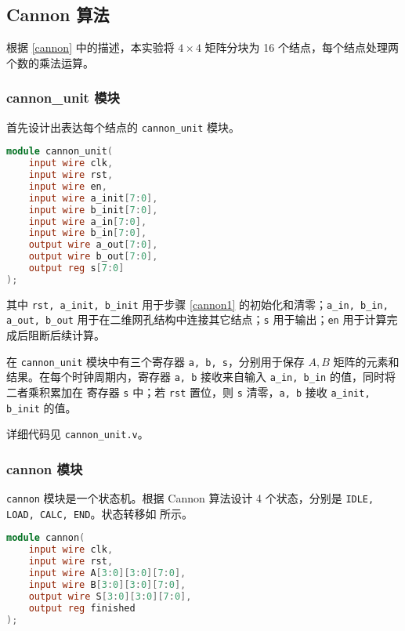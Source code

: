 \documentclass{zjureport-zh}
\begin{document}
\subsection{Cannon 算法}
\par 根据 \ref{cannon} 中的描述，本实验将 $4 \times 4$ 矩阵分块为 16 个结点，每个结点处理两个数的乘法运算。
\subsubsection{cannon\_unit 模块}
\par 首先设计出表达每个结点的 \texttt{cannon\_unit} 模块。
\begin{lstlisting}[language=verilog]
module cannon_unit(
	input wire clk,
	input wire rst,
	input wire en,
	input wire a_init[7:0],
	input wire b_init[7:0],
	input wire a_in[7:0],
	input wire b_in[7:0],
	output wire a_out[7:0],
	output wire b_out[7:0],
	output reg s[7:0]
);
\end{lstlisting}
\par 其中 \texttt{rst, a\_init, b\_init} 用于步骤 \ref{cannon1} 的初始化和清零；\texttt{a\_in, b\_in, a\_out, b\_out} 用于在二维网孔结构中连接其它结点；\texttt{s} 用于输出；\texttt{en} 用于计算完成后阻断后续计算。
\par 在 \texttt{cannon\_unit} 模块中有三个寄存器 \texttt{a, b, s}，分别用于保存 $A,B$ 矩阵的元素和结果。在每个时钟周期内，寄存器 \texttt{a, b} 接收来自输入 \texttt{a\_in, b\_in} 的值，同时将二者乘积累加在 寄存器 \texttt{s} 中；若 \texttt{rst} 置位，则 \texttt{s} 清零，\texttt{a, b} 接收 \texttt{a\_init, b\_init} 的值。
\par \par 详细代码见 \texttt{cannon\_unit.v}。

\subsubsection{cannon 模块}
\par \texttt{cannon} 模块是一个状态机。根据 Cannon 算法设计 4 个状态，分别是 \texttt{IDLE, LOAD, CALC, END}。状态转移如 所示。

\begin{lstlisting}[language=verilog]
module cannon(
	input wire clk,
	input wire rst,
	input wire A[3:0][3:0][7:0],
	input wire B[3:0][3:0][7:0],
	output wire S[3:0][3:0][7:0],
	output reg finished
);
\end{lstlisting}
\end{document}
